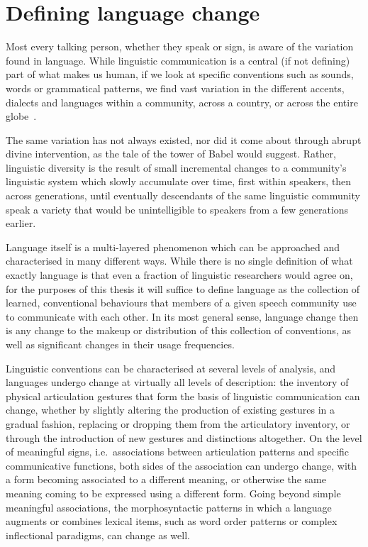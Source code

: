 \section{Defining language change}

Most every talking person, whether they speak or sign, is aware of the variation found in language. While linguistic communication is a central (if not defining) part of what makes us human, if we look at specific conventions such as sounds, words or grammatical patterns, we find vast variation in the different accents, dialects and languages within a community, across a country, or across the entire globe~\citep{Evans2009}.

The same variation has not always existed, nor did it come about through abrupt divine intervention, as the tale of the tower of Babel would suggest. Rather, linguistic diversity is the result of small incremental changes to a community's linguistic system which slowly accumulate over time, first within speakers, then across generations, until eventually descendants of the same linguistic community speak a variety that would be unintelligible to speakers from a few generations earlier.

Language itself is a multi-layered phenomenon which can be approached and characterised in many different ways. While there is no single definition of what exactly language is that even a fraction of linguistic researchers would agree on, for the purposes of this thesis it will suffice to define language as the collection of learned, conventional behaviours %
that members of a given speech community use to communicate with each other. In its most general sense, language change then is any change to the makeup or distribution of this collection of conventions, as well as significant changes in their usage frequencies.

Linguistic conventions can be characterised at several levels of analysis, and languages undergo change at virtually all levels of description: the inventory of physical articulation gestures that form the basis of linguistic communication can change, whether by slightly altering the production of existing gestures in a gradual fashion, replacing or dropping them from the articulatory inventory, or through the introduction of new gestures and distinctions altogether. On the level of meaningful signs, i.e.~associations between articulation patterns and specific communicative functions, both sides of the association can undergo change, with a form becoming associated to a different meaning, or otherwise the same meaning coming to be expressed using a different form. Going beyond simple meaningful associations, the morphosyntactic patterns in which a language augments or combines lexical items, such as word order patterns or complex inflectional paradigms, can change as well.

